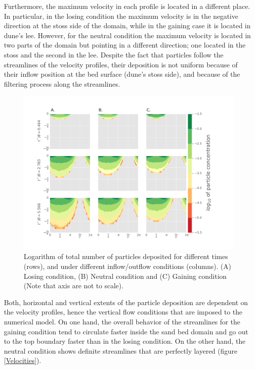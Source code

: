 \documentclass[draft,linenumbers]{agujournal2018}
\begin{document}
Furthermore, the maximum velocity in each profile is located in a different place. In particular, in the losing condition the maximum velocity is in the negative direction at the stoss side of the domain, while in the gaining case it is located in dune's lee. However, for the neutral condition the maximum velocity is located in two parts of the domain but pointing in a different direction; one located in the stoss and the second in the lee. Despite the fact that particles follow the streamlines of the velocity profiles, their deposition is not uniform because of their inflow position at the bed surface (dune's stoss side), and because of the filtering process along the streamlines.

\begin{figure}
\centering
\includegraphics[trim=0.2cm 0.2cm 0.2cm 0.2cm, width=60pc]
{190131_Logplot.pdf}
\caption{Logarithm of total number of particles deposited for different times (rows), and under different inflow/outflow conditions (columns). (A) Losing condition, (B) Neutral condition and (C) Gaining condition (Note that axis are not to scale).}
\label{Logmap}
\end{figure}

Both, horizontal and vertical extents of the particle deposition are dependent on the velocity profiles, hence the vertical flow conditions that are imposed to the numerical model. On one hand, the overall behavior of the streamlines for the gaining condition tend to circulate faster inside the sand bed domain and go out to the top boundary faster than in the losing condition. On the other hand, the neutral condition shows definite streamlines that are perfectly layered (figure \ref{Velocities}).
\end{document}
